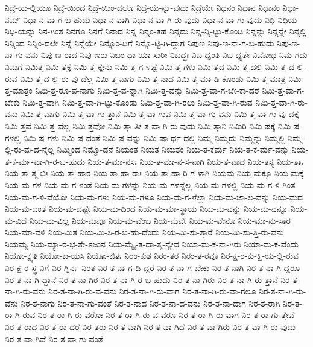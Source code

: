 {ನಿದ್ರೆ-ಯ-ಲ್ಲಿಯೂ
ನಿದ್ರೆ-ಯಿಂದ
ನಿದ್ರೆ-ಯಿಂ-ದಲೊ
ನಿದ್ರೆ-ಯೆ-ನ್ನು-ವುದು
ನಿದ್ರೆಯೇ
ನಿಧನಂ
ನಿಧಾನ
ನಿಧಾನಂ
ನಿಧಾ-ನಮ್
ನಿಧಾ-ನ-ವಾ-ಗ-ಬ-ಹುದು
ನಿಧಾ-ನ-ವಾಗಿ
ನಿಧಾ-ನ-ವಾ-ಗಿ-ರು-ವುದು
ನಿಧಾ-ನ-ವಾ-ಗು-ವುದು
ನಿಧಿ
ನಿಧಿಯ
ನಿಧಿ-ಯನ್ನು
ನಿನ-ಗಿಂತ
ನಿನಗೂ
ನಿನಗೆ
ನಿನಾದ
ನಿನ್ನ
ನಿನ್ನಂ-ತಹ
ನಿನ್ನದು
ನಿನ್ನ-ನ್ನಿ-ಟ್ಟು-ಕೊಂಡಿ
ನಿನ್ನನ್ನು
ನಿನ್ನನ್ನೇ
ನಿನ್ನಲ್ಲಿ
ನಿನ್ನಿಂದ
ನಿನ್ನಿಂ-ದಲೇ
ನಿನ್ನೆ
ನಿನ್ನೆಯೇ
ನಿನ್ನೊಂ-ದಿಗೆ
ನಿನ್ನೊ-ಟ್ಟಿ-ಗಿ-ದ್ದಾಗ
ನಿಪುಣ
ನಿಪು-ಣ-ನಾ-ಗ-ಬ-ಹುದು
ನಿಪು-ಣ-ನಾ-ಗು-ವನು
ನಿಪು-ಣ-ರಾದ
ನಿಪು-ಣರು
ನಿಬಂ-ಧಾ-ಯಾ-ಸುರೀ
ನಿಬದ್ಧಃ
ನಿಬ-ಧ್ನಂತಿ
ನಿಬ-ಧ್ಯತೇ
ನಿಬೋಧ
ನಿಮ-ಗದು
ನಿಮಗೆ
ನಿಮಿತ್ತ
ನಿಮಿ-ತ್ತಕ್ಕೆ
ನಿಮಿ-ತ್ತ-ಕ್ಕೇನು
ನಿಮಿ-ತ್ತ-ಗ-ಳಷ್ಟೆ
ನಿಮಿ-ತ್ತ-ಗಳು
ನಿಮಿ-ತ್ತದ
ನಿಮಿ-ತ್ತ-ದಲ್ಲಿ
ನಿಮಿ-ತ್ತ-ದ-ಲ್ಲಿ-ರುವ
ನಿಮಿ-ತ್ತ-ದ-ಲ್ಲಿ-ರು-ವು-ದೆಲ್ಲ
ನಿಮಿ-ತ್ತ-ನಾಗು
ನಿಮಿ-ತ್ತ-ನಾದ
ನಿಮಿ-ತ್ತ-ಮಾ-ಡಿ-ಕೊಂಡು
ನಿಮಿ-ತ್ತ-ಮಾತ್ರ
ನಿಮಿ-ತ್ತ-ಮಾತ್ರಂ
ನಿಮಿ-ತ್ತ-ರೂ-ಪ-ನಾಗು
ನಿಮಿ-ತ್ತ-ವ-ನ್ನಾಗಿ
ನಿಮಿ-ತ್ತ-ವನ್ನು
ನಿಮಿ-ತ್ತ-ವಾ-ಗ-ಬೇ-ಕಾ-ದರೆ
ನಿಮಿ-ತ್ತ-ವಾ-ಗ-ಬೇಕು
ನಿಮಿ-ತ್ತ-ವಾಗಿ
ನಿಮಿ-ತ್ತ-ವಾ-ಗಿ-ಟ್ಟು-ಕೊಂಡು
ನಿಮಿ-ತ್ತ-ವಾ-ಗಿ-ರಲು
ನಿಮಿ-ತ್ತ-ವಾ-ಗಿ-ರುವ
ನಿಮಿ-ತ್ತ-ವಾ-ಗಿ-ರು-ವನು
ನಿಮಿ-ತ್ತ-ವಾಗು
ನಿಮಿ-ತ್ತ-ವಾ-ಗು-ತ್ತಾನೆ
ನಿಮಿ-ತ್ತ-ವಾ-ಗುವ
ನಿಮಿ-ತ್ತ-ವಾ-ಗು-ವನು
ನಿಮಿ-ತ್ತ-ವಾ-ಗು-ವು-ದಕ್ಕೆ
ನಿಮಿ-ತ್ತವೆ
ನಿಮಿ-ತ್ತ-ವೆಲ್ಲ
ನಿಮಿ-ತ್ತವೋ
ನಿಮಿ-ತ್ತಾ-ತೀ-ತ-ವಾ-ಗಿ-ರು-ವುದು
ನಿಮಿ-ತ್ತಾನಿ
ನಿಮಿರಿ
ನಿಮಿ-ಷಕ್ಕೆ
ನಿಮಿ-ಷ-ಗಳಲ್ಲಿ
ನಿಮಿ-ಷ-ಗಳು
ನಿಮಿ-ಷ-ದಂತೆ
ನಿಮಿ-ಷ-ವನ್ನು
ನಿಮಿ-ಷಾ-ರ್ಧ-ದಲ್ಲಿ
ನಿಮ್ಮ
ನಿಮ್ಮದು
ನಿಮ್ಮನ್ನು
ನಿಮ್ಮಲ್ಲಿ
ನಿಮ್ಮ-ಲ್ಲಿ-ರು-ವು-ದ-ನ್ನೆಲ್ಲ
ನಿಮ್ಮಿಂದ
ನಿಮ್ಮೊ-ಡನೆ
ನಿಯಂತ
ನಿಯತ
ನಿಯತಂ
ನಿಯ-ತ-ಕರ್ಮ
ನಿಯ-ತ-ಕ-ರ್ಮ-ವನ್ನು
ನಿಯ-ತ-ಕ-ರ್ಮ-ವಾ-ಗಿ-ರ-ಬ-ಹುದು
ನಿಯ-ತ-ಮಾ-ನಸಃ
ನಿಯ-ತ-ಮಾ-ನ-ಸ-ನಾಗಿ
ನಿಯ-ತ-ವಾದ
ನಿಯ-ತಸ್ಯ
ನಿಯ-ತಾಃ
ನಿಯ-ತಾ-ತ್ಮ-ಭಿಃ
ನಿಯ-ತಾ-ಹಾರ
ನಿಯ-ತಾ-ಹಾ-ರಾಃ
ನಿಯ-ತಾ-ಹಾ-ರಿ-ಗ-ಳಾಗಿ
ನಿಯಮ
ನಿಯ-ಮಕ್ಕೂ
ನಿಯ-ಮಕ್ಕೆ
ನಿಯ-ಮ-ಗಳ
ನಿಯ-ಮ-ಗ-ಳಂತೆ
ನಿಯ-ಮ-ಗಳನ್ನು
ನಿಯ-ಮ-ಗಳನ್ನೆಲ್ಲ
ನಿಯ-ಮ-ಗಳಲ್ಲಿ
ನಿಯ-ಮ-ಗ-ಳಿ-ಗಿಂತ
ನಿಯ-ಮ-ಗ-ಳಿ-ವೆಯೋ
ನಿಯ-ಮ-ಗಳು
ನಿಯ-ಮ-ಗಳೂ
ನಿಯ-ಮ-ಗ-ಳೆಲ್ಲಾ
ನಿಯ-ಮ-ಜಾ-ಲ-ವನ್ನು
ನಿಯ-ಮದ
ನಿಯ-ಮ-ದಂತೆ
ನಿಯ-ಮ-ದಷ್ಟೇ
ನಿಯ-ಮ-ದಿಂದ
ನಿಯ-ಮ-ಮಾ-ಸ್ಥಾಯ
ನಿಯ-ಮ-ವನ್ನು
ನಿಯ-ಮ-ವನ್ನೂ
ನಿಯ-ಮ-ವಿದೆ
ನಿಯ-ಮ-ವಿಲ್ಲ
ನಿಯ-ಮವೂ
ನಿಯ-ಮ-ವೆಂಬ
ನಿಯ-ಮವೇ
ನಿಯ-ಮ-ವೇನೊ
ನಿಯ-ಮಾ-ನು-ಸಾರ
ನಿಯ-ಮಾ-ವಳಿ
ನಿಯ-ಮಿತ
ನಿಯ-ಮಿ-ಸಿ-ರ-ಬ-ಹು-ದೆಂದು
ನಿಯ-ಮಿ-ಸು-ತ್ತಾರೆ
ನಿಯ-ಮಿ-ಸು-ತ್ತಿ-ರು-ವನು
ನಿಯಮ್ಯ
ನಿಯ-ಮ್ಯಾ-ರ-ಭ-ತೇ-ಽಜುನ
ನಿಯ-ಮ್ಯೈ-ತ-ದಾ-ತ್ಮ-ನ್ಯೇವ
ನಿಯಾ-ಮ-ಕ-ನಾ-ಗಿರು
ನಿಯಾ-ಮ-ಕ-ವೆಂದು
ನಿಯೋ-ಕ್ಷ್ಯತಿ
ನಿಯೋ-ಜ-ಯಸಿ
ನಿಯೋ-ಜಿತಃ
ನಿರಂ-ಕುಶ
ನಿರಂ-ತರ
ನಿರಂ-ತ-ರವೂ
ನಿರ-ಕ್ಷ-ರ-ಕು-ಕ್ಷಿ-ಯ-ಲ್ಲಿ-ರುವ
ನಿರ-ಕ್ಷ-ರ-ಸ್ಥ-ನಿಗೆ
ನಿರ-ಗ್ನಿರ್ನ
ನಿರತ
ನಿರ-ತ-ನಾ-ಗ-ದಿ-ದ್ದರೆ
ನಿರ-ತ-ನಾ-ಗ-ಬೇಕು
ನಿರ-ತ-ನಾಗಿ
ನಿರ-ತ-ನಾ-ಗಿ-ದ್ದರೂ
ನಿರ-ತ-ನಾ-ಗಿ-ದ್ದಾನೆ
ನಿರ-ತ-ನಾ-ಗಿರ
ನಿರ-ತ-ನಾ-ಗಿ-ರ-ಬ-ಹುದು
ನಿರ-ತ-ನಾ-ಗಿರು
ನಿರ-ತ-ನಾ-ಗಿ-ರು-ತ್ತಾನೆ
ನಿರ-ತ-ನಾ-ಗಿ-ರು-ವನು
ನಿರ-ತ-ನಾ-ಗಿ-ರು-ವ-ವನು
ನಿರ-ತ-ನಾ-ಗಿ-ರು-ವಾಗ
ನಿರ-ತ-ನಾ-ಗಿ-ರು-ವಾ-ಗಲೂ
ನಿರ-ತ-ನಾ-ಗಿ-ರು-ವೆನು
ನಿರ-ತ-ನಾಗು
ನಿರ-ತ-ನಾ-ಗು-ವಂತೆ
ನಿರ-ತ-ನಾದ
ನಿರ-ತ-ನಾ-ದ-ವನು
ನಿರ-ತ-ನಾ-ದಾಗ
ನಿರ-ತ-ರಾಗಿ
ನಿರ-ತ-ರಾ-ಗಿ-ರುವ
ನಿರ-ತ-ರಾ-ಗಿ-ರು-ವರೋ
ನಿರ-ತ-ರಾ-ಗಿ-ರು-ವ-ವರೂ
ನಿರ-ತ-ರಾ-ಗಿ-ರು-ವಾಗ
ನಿರ-ತ-ರಾ-ಗು-ತ್ತೇವೆ
ನಿರ-ತ-ರಾದ
ನಿರ-ತ-ರಾ-ದರೆ
ನಿರ-ತರು
ನಿರ-ತ-ವಾಗಿ
ನಿರ-ತ-ವಾ-ಗಿದೆ
ನಿರ-ತ-ವಾ-ಗಿರು
ನಿರ-ತ-ವಾ-ಗಿ-ರು-ವುದು
ನಿರ-ತ-ವಾ-ಗಿವೆ
ನಿರ-ತ-ವಾ-ಗು-ವಂತೆ
}
